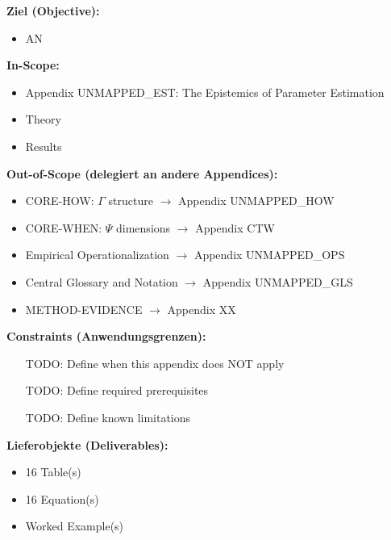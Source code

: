 
\begin{tcolorbox}[
    colback=orange!5!white,
    colframe=orange!75!black,
    title={\textbf{Appendix Scope: Ziel / In-Scope / Out-of-Scope / Constraints}},
    fonttitle=\bfseries
]

\textbf{Ziel (Objective):}
\begin{itemize}[nosep]
    \item AN
\end{itemize}

\textbf{In-Scope:}
\begin{itemize}[nosep]
    \item Appendix UNMAPPED_EST: The Epistemics of Parameter Estimation
    \item Theory
    \item Results
\end{itemize}

\textbf{Out-of-Scope (delegiert an andere Appendices):}
\begin{itemize}[nosep]
    \item CORE-HOW: $\Gamma$ structure $\rightarrow$ Appendix UNMAPPED_HOW
    \item CORE-WHEN: $\Psi$ dimensions $\rightarrow$ Appendix CTW
    \item Empirical Operationalization $\rightarrow$ Appendix UNMAPPED_OPS
    \item Central Glossary and Notation $\rightarrow$ Appendix UNMAPPED_GLS
    \item METHOD-EVIDENCE $\rightarrow$ Appendix XX
\end{itemize}

\textbf{Constraints (Anwendungsgrenzen):}
\begin{itemize}[nosep]
    \item [TODO: Define when this appendix does NOT apply]
    \item [TODO: Define required prerequisites]
    \item [TODO: Define known limitations]
\end{itemize}

\textbf{Lieferobjekte (Deliverables):}
\begin{itemize}[nosep]
    \item 16 Table(s)
    \item 16 Equation(s)
    \item Worked Example(s)
\end{itemize}

\end{tcolorbox}


